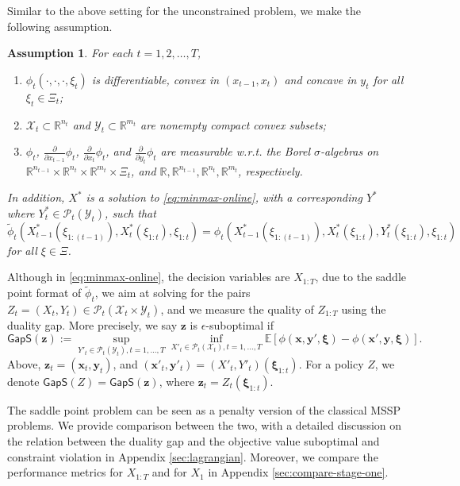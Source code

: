 \documentclass[11pt,fullpage,letterpaper]{article}
\newcommand{\mc}{\mathcal}
\newcommand{\mb}{\mathbf}
\newcommand{\R}{\mathbb{R}}
\newcommand{\E}{\mathbb{E}}
\newcommand{\bx}{\boldsymbol{\xi}}
\newcommand{\gaps}{\mathsf{GapS}}
\newtheorem{assumption}{Assumption}[section]
\begin{document}
Similar to the above setting for the unconstrained problem, we make the following assumption.
\begin{assumption}\label{assu:convex_saddle}
For each $t=1,2,\ldots,T$, 
    \begin{enumerate}
        \item $\phi_t(\cdot,\cdot,\cdot,\xi_t)$ is differentiable, convex in $(x_{t-1},x_t)$ and concave in $y_t$ for all $\xi_t\in \Xi_t$; 
        \item $\mc X_t\subset \R^{n_t}$ and $\mc Y_t\subset \R^{m_t}$ are nonempty compact convex subsets;
        \item $\phi_t$, $\frac{\partial }{\partial x_{t-1}}\phi_t$, $\frac{\partial }{\partial x_{t}}\phi_t$, and $\frac{\partial }{\partial y_{t}}\phi_t$ are measurable w.r.t. the Borel $\sigma$-algebras on $\R^{n_{t-1}}\times \R^{n_t}\times\R^{m_t}\times \Xi_t$, and $\R, \R^{n_{t-1}},\R^{n_t},\R^{m_t}$, respectively.
    \end{enumerate}
In addition, $X^*$ is a solution to \eqref{eq:minmax-online}, with a corresponding $Y^*$ where $Y_t^*\in \mc P_t(\mc Y_t)$, such that $\tilde{\phi}_{t}(X^*_{t-1}(\xi_{1:(t-1)}), X^*_t(\xi_{1:t}),\xi_{1:t})= \phi_{t}( X^*_{t-1}(\xi_{1:(t-1)}), X^*_t(\xi_{1:t}), Y^*_t(\xi_{1:t}),\xi_{1:t})$ for all $\xi\in \Xi$.
\end{assumption}


Although in \eqref{eq:minmax-online}, the decision variables are $X_{1:T}$, due to the saddle point format of $\widetilde{\phi}_t$, we aim at solving for the pairs $Z_t = (X_t,Y_t)\in \mc P_t(\mc X_t\times \mc Y_t)$, and we measure the quality of $Z_{1:T}$ using the duality gap. More precisely, we say $\mb z$ is $\epsilon$-suboptimal if 
\begin{displaymath}
    \gaps(\mb z):=\sup_{Y'_t\in \mc P_t(\mc Y_t),t=1,\ldots,T}\inf_{X'_t\in \mc P_t( \mc X_t) ,t=1,\ldots,T}\E[\phi(\mb x,\mb y',\bx)-\phi(\mb x',\mb y,\bx)]. 
\end{displaymath}
Above, $\mb z_t = (\mb x_t,\mb y_t)$, and $(\mb x'_t,\mb y'_t)=(X'_t,Y'_t)(\bx_{1:t})$. For a policy $Z$, we denote $\gaps(Z)=\gaps(\mb z)$, where $\mb z_t = Z_t(\bx_{1:t})$. 


The saddle point problem can be seen as a penalty version of the classical MSSP problems. We provide comparison between the two, with a detailed discussion on the relation between the duality gap and the objective value suboptimal and constraint violation in Appendix \ref{sec:lagrangian}. Moreover, we compare the performance metrics for $X_{1:T}$ and for $X_1$ in Appendix \ref{sec:compare-stage-one}.
\end{document}
